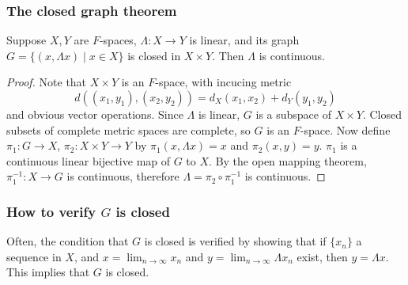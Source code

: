 \documentclass{beamer}
\begin{document}
\begin{frame}
\frametitle{The closed graph theorem}
\begin{theorem}
    Suppose $X,Y$ are $F$-spaces, $\Lambda: X \to Y$ is linear, and its graph $G = \{(x,\Lambda x)\mid x \in X\}$ is closed in $X \times Y$. Then $\Lambda$ is continuous.
\end{theorem}
\begin{proof}
    Note that $X\times Y$ is an $F$-space, with incucing metric \[d((x_1,y_1),(x_2,y_2)) = d_X(x_1,x_2) + d_Y(y_1,y_2)\] and obvious vector operations. Since $\Lambda$ is linear, $G$ is a subspace of $X\times Y$. Closed subsets of complete metric spaces are complete, so $G$ is an $F$-space. Now define $\pi_1 : G \to X$, $\pi_2 : X\times Y \to Y$ by $\pi_1(x,\Lambda x) = x$ and $\pi_2(x,y) = y$. $\pi_1$ is a continuous linear bijective map of $G$ to $X$. By the open mapping theorem, $\pi_1^{-1}: X \to G$ is continuous, therefore $\Lambda = \pi_2 \circ \pi_1^{-1}$ is continuous.
\end{proof}
\end{frame}
\begin{frame}
\frametitle{How to verify $G$ is closed}
Often, the condition that $G$ is closed is verified by showing that if $\{x_n\}$ a sequence in $X$, and $x = \lim_{n\to\infty}x_n$ and $y = \lim_{n\to\infty}\Lambda x_n$ exist, then $y = \Lambda x$. This implies that $G$ is closed.
\end{frame}
\end{document}
